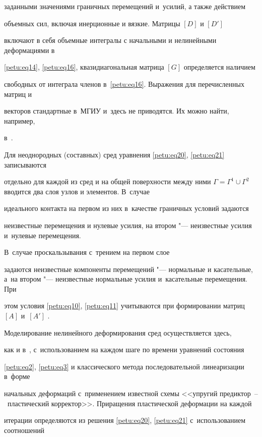 заданными значениями граничных перемещений и~усилий, а также действием

объемных сил, включая инерционные и вязкие. Матрицы $[D]$ и $[{D}']$

включают в себя объемные интегралы с начальными и нелинейными деформациями в

\eqref{petu:eq14}, \eqref{petu:eq16}, квазидиагональная матрица $[G]$ определяется наличием

свободных от интеграла членов в~\eqref{petu:eq16}. Выражения для перечисленных матриц и

векторов стандартные в~МГИУ и~здесь не приводятся. Их можно найти, например,

в~\cite{petu:bib2}.



Для неоднородных (составных) сред уравнения \eqref{petu:eq20}, \eqref{petu:eq21} записываются

отдельно для каждой из сред и на общей поверхности между ними $\Gamma

=\Gamma^1 \cup \Gamma^2$ вводится два слоя узлов и элементов. В~случае

идеального контакта на первом из них в~качестве граничных условий задаются

неизвестные перемещения и нулевые усилия, на втором "--- неизвестные усилия и~нулевые перемещения. 

В~случае проскальзывания с~трением на первом слое

задаются неизвестные компоненты перемещений "--- нормальные и касательные, а~на втором "--- неизвестные нормальные усилия и~касательные перемещения. При

этом условия \eqref{petu:eq10}, \eqref{petu:eq11} учитываются при формировании матриц $[A]$ и~$[{A}']$ .



Моделирование нелинейного деформирования сред осуществляется здесь, 

как и в~\cite{petu:bib13,petu:bib14}, с~использованием на каждом шаге по времени уравнений состояния

\eqref{petu:eq2}, \eqref{petu:eq3} и классического метода последовательной линеаризации в~форме

начальных деформаций с~применением известной схемы <<упругий предиктор~--~пластический корректор>>. Приращения пластической деформации на каждой

итерации определяются из решения \eqref{petu:eq20}, \eqref{petu:eq21} с~использованием соотношений

